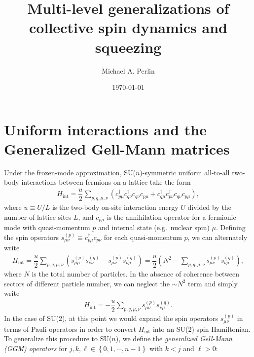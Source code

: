 \documentclass[nofootinbib,notitlepage,11pt]{revtex4-2}
\renewcommand{\t}{\text} %
\newcommand{\f}[2]{\dfrac{#1}{#2}} %
\newcommand{\p}[1]{\left(#1\right)} %
\renewcommand{\set}[1]{\left\{#1\right\}} %
\newcommand{\1}{\mathds{1}}
\begin{document}
\title{Multi-level generalizations of collective spin dynamics and
  squeezing}%
\author{Michael A. Perlin}%
\date{\today}

\maketitle
\thispagestyle{fancy}

\section{Uniform interactions and the Generalized Gell-Mann matrices}

Under the frozen-mode approximation, SU($n$)-symmetric uniform
all-to-all two-body interactions between fermions on a lattice take
the form\cite{perlin2019effective}
\begin{align}
  H_{\t{int}} = \f{u}{2} \sum_{p,q,\mu,\nu}
  \p{c_{p\mu}^\dag c_{q\nu}^\dag c_{q\nu} c_{p\mu}
    + c_{q\mu}^\dag c_{p\nu}^\dag c_{q\nu} c_{p\mu}},
\end{align}
where $u\equiv U/L$ is the two-body on-site interaction energy $U$
divided by the number of lattice sites $L$, and $c_{p\mu}$ is the
annihilation operator for a fermionic mode with quasi-momentum $p$ and
internal state (e.g.~nuclear spin) $\mu$.  Defining the spin operators
$s_{\mu\nu}^{(p)}\equiv c_{p\mu}^\dag c_{p\nu}$ for each
quasi-momentum $p$, we can alternately write
\begin{align}
  H_{\t{int}} = \f{u}{2} \sum_{p,q,\mu,\nu}
  \p{s_{\mu\mu}^{(p)} s_{\nu\nu}^{(q)} - s_{\mu\nu}^{(p)} s_{\nu\mu}^{(q)}}
  = \f{u}{2}\p{N^2 - \sum_{p,q,\mu,\nu} s_{\mu\nu}^{(p)} s_{\nu\mu}^{(q)}},
\end{align}
where $N$ is the total number of particles.  In the absence of
coherence between sectors of different particle number, we can neglect
the $\sim N^2$ term and simply write
\begin{align}
  H_{\t{int}}
  = - \f{u}{2} \sum_{p,q,\mu,\nu} s_{\mu\nu}^{(p)} s_{\nu\mu}^{(q)}.
  \label{eq:H_int_start}
\end{align}
In the case of SU(2), at this point we would expand the spin operators
$s_{\mu\nu}^{(p)}$ in terms of Pauli operators in order to convert
$H_{\t{int}}$ into an SU(2) spin Hamiltonian.  To generalize this
procedure to SU($n$), we define the {\it generalized Gell-Mann (GGM)
  operators}\cite{hioe1981level, bertlmann2008bloch} for
$j,k,\ell\in\set{0,1,\cdots,n-1}$ with $k<j$ and $\ell>0$:
\end{document}
